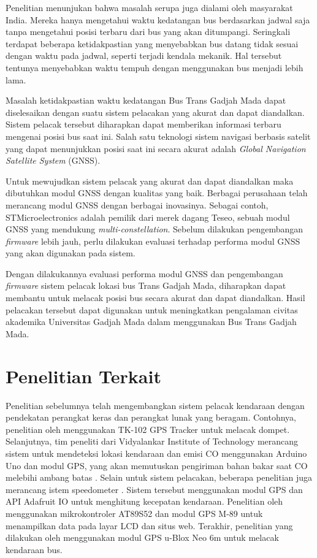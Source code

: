\documentclass[conference]{IEEEtran}
\begin{document}
Penelitian \cite{Sutar2016} menunjukan bahwa masalah serupa juga dialami oleh masyarakat India. Mereka hanya mengetahui waktu kedatangan bus berdasarkan jadwal saja tanpa mengetahui posisi terbaru dari bus yang akan ditumpangi. Seringkali terdapat beberapa ketidakpastian yang menyebabkan bus datang tidak sesuai dengan waktu pada jadwal, seperti terjadi kendala mekanik. Hal tersebut tentunya menyebabkan waktu tempuh dengan menggunakan bus menjadi lebih lama.

Masalah ketidakpastian waktu kedatangan Bus Trans Gadjah Mada dapat diselesaikan dengan suatu sistem pelacakan yang akurat dan dapat diandalkan. Sistem pelacak tersebut diharapkan dapat memberikan informasi terbaru mengenai posisi bus saat ini. Salah satu teknologi sistem navigasi berbasis satelit yang dapat menunjukkan posisi saat ini secara akurat adalah \textit{Global Navigation Satellite System} (GNSS).

Untuk mewujudkan sistem pelacak yang akurat dan dapat diandalkan maka dibutuhkan modul GNSS dengan kualitas yang baik. Berbagai perusahaan telah merancang modul GNSS dengan berbagai inovasinya. Sebagai contoh, STMicroelectronics adalah pemilik dari merek dagang Teseo, sebuah modul GNSS yang mendukung \textit{multi-constellation}. Sebelum dilakukan pengembangan \textit{firmware} lebih jauh, perlu dilakukan evaluasi terhadap performa modul GNSS yang akan digunakan pada sistem.

Dengan dilakukannya evaluasi performa modul GNSS dan pengembangan \textit{firmware} sistem pelacak lokasi bus Trans Gadjah Mada, diharapkan dapat membantu untuk melacak posisi bus secara akurat dan dapat diandalkan. Hasil pelacakan tersebut dapat digunakan untuk meningkatkan pengalaman civitas akademika Universitas Gadjah Mada dalam menggunakan Bus Trans Gadjah Mada.

\section{Penelitian Terkait}
Penelitian sebelumnya telah mengembangkan sistem pelacak kendaraan dengan pendekatan perangkat keras dan perangkat lunak yang beragam. Contohnya, penelitian oleh \cite{Ekhsan2022} menggunakan TK-102 GPS Tracker untuk melacak dompet. Selanjutnya, tim peneliti dari Vidyalankar Institute of Technology merancang sistem untuk mendeteksi lokasi kendaraan dan emisi CO menggunakan Arduino Uno dan modul GPS, yang akan memutuskan pengiriman bahan bakar saat CO melebihi ambang batas  \cite{Asha2022}. Selain untuk sistem pelacakan, beberapa penelitian juga merancang istem speedometer \cite{Najmurrokhman2021}. Sistem tersebut menggunakan modul GPS dan API Adafruit IO untuk menghitung kecepatan kendaraan. Penelitian oleh \cite{Mukhtar2015} menggunakan mikrokontroler AT89S52 dan modul GPS M-89 untuk menampilkan data pada layar LCD dan situs web. Terakhir, penelitian yang dilakukan oleh \cite{Widya2016} menggunakan modul GPS u-Blox Neo 6m untuk melacak kendaraan bus.
\end{document}
